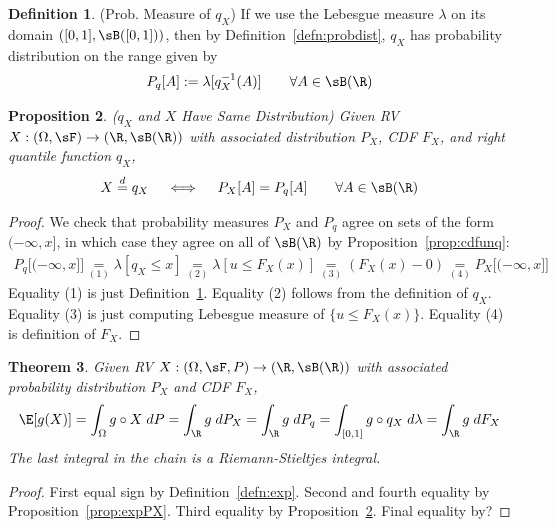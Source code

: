 \documentclass[12pt]{article}
\theoremstyle{plain}
\newtheorem{thm}{Theorem}[section]
\newtheorem{prop}[thm]{Proposition}
\theoremstyle{definition}
\newtheorem{defn}[thm]{Definition}
\theoremstyle{remark}
\newcommand{\ra}{\rightarrow}
\begin{document}
\begin{defn}(Prob. Measure of $q_X$)
\label{defn:probdistq}
If we use the Lebesgue measure $\lambda$ on its domain
$([0,1],\sB([0,1]))$, then by Definition~\ref{defn:probdist}, $q_X$ has
probability distribution on the range given by
\begin{align*}
  P_q[A] := \lambda[q_X^{-1}(A)]
  \qquad \forall A\in\sB(\R)
\end{align*}
\end{defn}


\begin{prop}\emph{($q_X$ and $X$ Have Same Distribution)}
\label{prop:equaldistqX}
Given RV $X:(\Omega,\sF)\ra(\R,\sB(\R))$ with associated
distribution $P_X$, CDF $F_X$, and right quantile function $q_X$,
\begin{align*}
  X \overset{d}{=} q_X
  \quad\iff\quad
  P_X[A] = P_q[A]
  \qquad \forall A\in\sB(\R)
\end{align*}
\end{prop}
\begin{proof}
We check that probability measures $P_X$ and $P_q$ agree on sets of the
form $(-\infty,x]$, in which case they agree on all of $\sB(\R)$ by
Proposition~\ref{prop:cdfunq}:
\begin{align*}
  P_q\big[(-\infty,x]\big]
  \underset{(1)}{=} \lambda[q_X \leq x]
  \underset{(2)}{=} \lambda[u\leq F_X(x)]
  \underset{(3)}{=} (F_X(x)- 0)
  \underset{(4)}{=} P_X\big[(-\infty,x]\big]
\end{align*}
Equality (1) is just Definition~\ref{defn:probdistq}.
Equality (2) follows from the definition of $q_X$.
Equality (3) is just computing Lebesgue measure of
$\{u\leq F_X(x)\}$.
Equality (4) is definition of $F_X$.
\end{proof}

\begin{thm}
\label{thm:expgX}
Given RV $X:(\Omega,\sF,P)\ra(\R,\sB(\R))$ with associated probability
distribution $P_X$ and CDF $F_X$,
\begin{align*}
  \E[g(X)]
  = \int_\Omega g\circ X \; dP
  = \int_\R g \; dP_X
  = \int_\R g \; dP_q
  = \int_{[0,1]} g \circ q_X \; d\lambda
  = \int_\R g  \; dF_X
\end{align*}
The last integral in the chain is a Riemann-Stieltjes integral.
\end{thm}
\begin{proof}
First equal sign by Definition~\ref{defn:exp}.
Second and fourth equality by Proposition~\ref{prop:expPX}.
Third equality by Proposition~\ref{prop:equaldistqX}.
Final equality by?
\end{proof}
\end{document}
